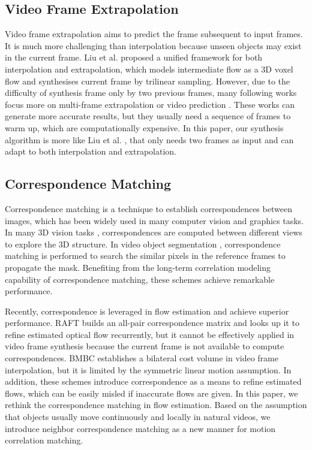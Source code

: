 \documentclass[sigconf]{acmart}
\begin{document}
\subsection{Video Frame Extrapolation}
Video frame extrapolation aims to predict the frame subsequent to input frames. It is much more challenging than interpolation because unseen objects may exist in the current frame. Liu et al. \cite{liu2017video} proposed a unified framework for both interpolation and extrapolation, which models intermediate flow as a 3D voxel flow and synthesises current frame by trilinear sampling.
However, due to the difficulty of synthesis frame only by two previous frames, many following works focus more on multi-frame extrapolation or video prediction \cite{lee2021video,le2021ccvs,wang2021predrnn}. These works can generate more accurate results, but they usually need a sequence of frames to warm up, which are computationally expensive. In this paper, our synthesis algorithm is more like Liu et al. \cite{liu2017video}, that only needs two frames as input and can adapt to both interpolation and extrapolation.

\subsection{Correspondence Matching}

Correspondence matching is a technique to establish correspondences between images, which has been widely used in many computer vision and graphics tasks. In many 3D vision tasks \cite{hartley2003multiple,agarwal2011building,schonberger2016structure}, correspondences are computed between different views to explore the 3D structure. In video object segmentation  \cite{yang2021collaborative,cheng2021rethinking}, correspondence matching is performed to search the similar pixels in the reference frames to propagate the mask. Benefiting from the long-term correlation modeling capability of correspondence matching, these schemes achieve remarkable performance.

Recently, correspondence is leveraged in flow estimation \cite{teed2020raft, park2020bmbc} and achieve superior performance. RAFT \cite{teed2020raft} builds an all-pair correspondence matrix and looks up it to refine estimated optical flow recurrently, but it cannot be effectively applied in video frame synthesis because the current frame is not available to compute correspondences. BMBC \cite{park2020bmbc} establishes a bilateral cost volume in video frame interpolation, but it is limited by the symmetric linear motion assumption. In addition, these schemes introduce correspondence as a means to refine estimated flows, which can be easily misled if inaccurate flows are given. In this paper, we rethink the correspondence matching in flow estimation. Based on the assumption that objects usually move continuously and locally in natural videos, we introduce neighbor correspondence matching as a new manner for motion correlation matching. 
\end{document}
